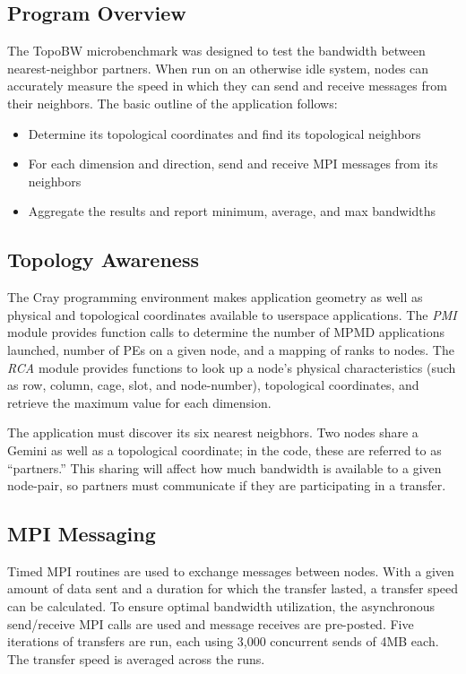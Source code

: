 \documentclass[10pt, conference, compsocconf]{IEEEtran}
\begin{document}
\subsection{Program Overview}

The TopoBW microbenchmark was designed to test the bandwidth between
nearest-neighbor partners.  When run on an otherwise idle system, nodes can
accurately measure the speed in which they can send and receive messages from
their neighbors.  The basic outline of the application follows:

\begin{itemize}
	\item Determine its topological coordinates and find its topological neighbors
	\item For each dimension and direction, send and receive MPI messages from its neighbors
	\item Aggregate the results and report minimum, average, and max bandwidths
\end{itemize}

\subsection{Topology Awareness}

The Cray programming environment makes application geometry as well as physical
and topological coordinates available to userspace applications.  The
\emph{PMI} module provides function calls to determine the number of MPMD
applications launched, number of PEs on a given node, and a mapping of ranks to
nodes.  The \emph{RCA} module provides functions to look up a node's physical
characteristics (such as row, column, cage, slot, and node-number), topological
coordinates, and retrieve the maximum value for each dimension.

The application must discover its six nearest neigbhors.  Two nodes share a
Gemini as well as a topological coordinate;  in the code, these are referred to
as ``partners.''  This sharing will affect how much bandwidth is available to a
given node-pair, so partners must communicate if they are participating in a
transfer.

\subsection{MPI Messaging}

Timed MPI routines are used to exchange messages between nodes.  With a given
amount of data sent and a duration for which the transfer lasted, a transfer
speed can be calculated.  To ensure optimal bandwidth utilization, the
asynchronous send/receive MPI calls are used and message receives are
pre-posted.  Five iterations of transfers are run, each using 3,000 concurrent
sends of 4MB each.  The transfer speed is averaged across the runs.
\end{document}

